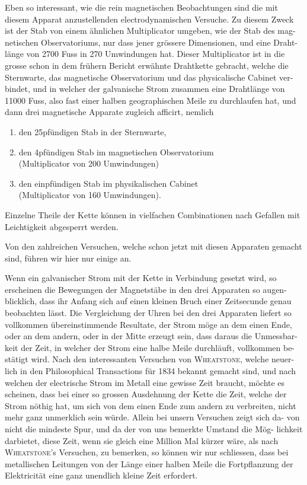 \documentclass[12pt,a4paper]{article}
\begin{document}
\medskip

Eben so interessant, wie die rein magnetischen Beobachtungen sind die mit 
diesem Apparat anzustellenden electrodynamischen Versuche. Zu diesem Zweck 
ist der Stab von einem ähnlichen Multiplicator umgeben, wie der Stab des mag-
netischen Observatoriums, nur dass jener grössere Dimensionen, und eine Draht-
länge von 2700 Fuss in 270 Umwindungen hat. Dieser Multiplicator ist in die 
grosse schon in dem frühern Bericht erwähnte Drahtkette gebracht, welche die 
Sternwarte, das magnetische Observatorium und das physicalische Cabinet ver-
bindet, und in welcher der galvanische Strom zusammen eine Drahtlänge von 
11000 Fuss, also fast einer halben geographischen Meile zu durchlaufen hat, 
und dann drei magnetische Apparate zugleich afficirt, nemlich
\begin{enumerate}
\item[I.] den 25pfündigen Stab in der Sternwarte,
\item[II.] den 4pfündigen Stab im magnetischen Observatorium\\(Multiplicator von 200 Umwindungen)
\item[III.] den einpfündigen Stab im physikalischen Cabinet\\(Multiplicator von 160 Umwindungen).
\end{enumerate}
Einzelne Theile der Kette können in vielfachen Combinationen nach Gefallen 
mit Leichtigkeit abgesperrt werden.

Von den zahlreichen Versuchen, welche schon jetzt mit diesen Apparaten 
gemacht sind, führen wir hier nur einige an.

Wenn ein galvanischer Strom mit der Kette in Verbindung gesetzt wird, 
so erscheinen die Bewegungen der Magnetstäbe in den drei Apparaten so augen-
blicklich, dass ihr Anfang sich auf einen kleinen Bruch einer Zeitsecunde genau 
beobachten lässt. Die Vergleichung der Uhren bei den drei Apparaten liefert so 
vollkommen übereinstimmende Resultate, der Strom möge an dem einen Ende, 
oder an dem andern, oder in der Mitte erzeugt sein, dass daraus die Unmessbar-
keit der Zeit, in welcher der Strom eine halbe Meile durchläuft, vollkommen be-
stätigt wird. Nach den interessanten Versuchen von \textsc{Wheatstone}, welche neuer-
lich in den Philosophical Transactions für 1834 bekannt gemacht sind, und nach 
welchen der electrische Strom im Metall eine gewisse Zeit braucht, möchte es 
scheinen, dass bei einer so grossen Ausdehnung der Kette die Zeit, welche der 
Strom nöthig hat, um sich von dem einen Ende zum andern zu verbreiten, nicht 
mehr ganz unmerklich sein würde. Allein bei unsern Versuchen zeigt sich da-
von nicht die mindeste Spur, und da der von uns bemerkte Umstand die Mög-
lichkeit darbietet, diese Zeit, wenn sie gleich eine Million Mal kürzer wäre, als 
nach \textsc{Wheatstone}'s Versuchen, zu bemerken, so können wir nur schliessen, dass 
bei metallischen Leitungen von der Länge einer halben Meile die Fortpflanzung 
der Elektricität eine ganz unendlich kleine Zeit erfordert.
\end{document}
